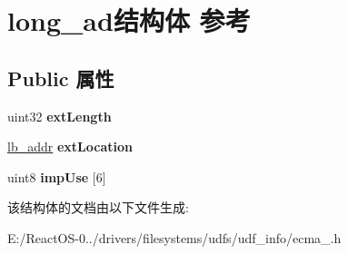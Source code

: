 \hypertarget{structlong__ad}{}\section{long\+\_\+ad结构体 参考}
\label{structlong__ad}
\subsection*{Public 属性}
\begin{DoxyCompactItemize}
\item 
\mbox{\label{structlong__ad_a596332e563cf51c574c3ba3ec7018c2e}} 
uint32 {\bfseries ext\+Length}
\item 
\mbox{\label{structlong__ad_a47a8cbd4560fbd9c7f6c0834fe65103f}} 
\hyperlink{structlb__addr}{lb\+\_\+addr} {\bfseries ext\+Location}
\item 
\mbox{\label{structlong__ad_ae49d73f5c2e77814347ae30c6d7f4444}} 
uint8 {\bfseries imp\+Use} \mbox{[}6\mbox{]}
\end{DoxyCompactItemize}


该结构体的文档由以下文件生成\+:\begin{DoxyCompactItemize}
\item 
E\+:/\+React\+O\+S-\/0../drivers/filesystems/udfs/udf\+\_\+info/ecma\+\_.\+h\end{DoxyCompactItemize}
